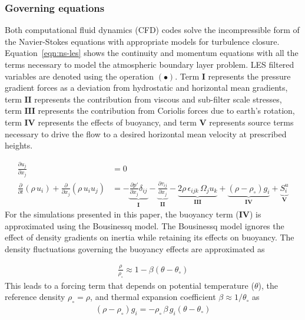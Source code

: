
\subsubsection{Governing equations}
Both computational fluid dynamics (CFD) codes solve the incompressible form of
the Navier-Stokes equations with appropriate models for turbulence
closure. Equation~\ref{eqn:ns-les} shows the continuity and momentum equations
with all the terms necessary to model the atmospheric boundary layer
problem. LES filtered variables are denoted using the operation ${\left(\bullet \right)}$.
Term $\mathbf{I}$ represents the pressure gradient forces as a
deviation from hydrostatic and horizontal mean gradients, term $\mathbf{II}$
represents the contribution from viscous and sub-filter scale stresses, term
$\mathbf{III}$ represents the contribution from Coriolis forces due to earth's
rotation, term $\mathbf{IV}$ represents the effects of buoyancy, and term
$\mathbf{V}$ represents source terms necessary to drive the flow to a desired
horizontal mean velocity at prescribed heights.

\begin{align}
  \frac{\partial {u_j}}{\partial x_j} & = 0 \nonumber\\
  \frac{\partial}{\partial t} \left(\rho\, {u}_i\right) +
  \frac{\partial}{\partial x_j} \left( \rho\, {u}_i {u}_j \right) &=
  - \underbrace{\frac{\partial p'}{\partial x_j} \delta_{ij}}_\mathbf{I}
  - \underbrace{\frac{\partial \tau_{ij}}{\partial x_j}}_\mathbf{II}
  - \underbrace{2\rho\,\epsilon_{ijk}\,\Omega_j{u_k}}_\mathbf{III}
  + \underbrace{\left(\rho - \rho_\circ \right) g_i}_\mathbf{IV}
  + \underbrace{S^{u}_{i}}_\mathbf{V} \label{eqn:ns-les}
\end{align}
For the simulations presented in this paper, the buoyancy term ($\mathbf{IV}$)
is approximated using the Bousinessq model. The Bousinessq model ignores the
effect of density gradients on inertia while retaining its effects on buoyancy.
The density fluctuations governing the buoyancy effects are approximated as

\begin{align}
  \frac{\rho}{\rho_\circ} \approx 1 - \beta \left( \theta - \theta_\circ \right)
\end{align}
This leads to a forcing term that depends on potential temperature ($\theta$),
the reference density $\rho_\circ = \rho$, and thermal expansion
coefficient $\beta \approx 1 / \theta_\circ$ as
\begin{align}
  \left(\rho - \rho_\circ \right) g_i = -\rho_\circ\, \beta\, g_i \left( \theta - \theta_\circ \right)
\end{align}

